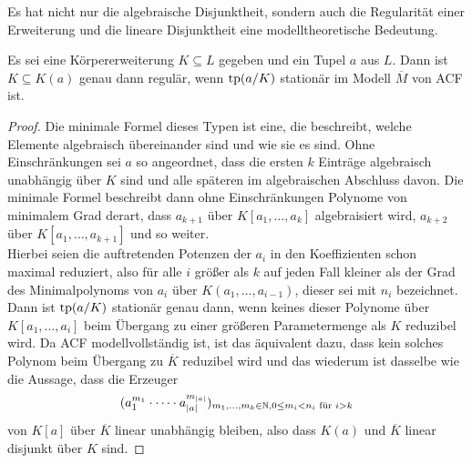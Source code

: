     Es hat nicht nur die algebraische Disjunktheit, sondern auch die Regularität einer Erweiterung und die lineare Disjunktheit eine modelltheoretische Bedeutung.
    
    \begin{lemma}
    	Es sei eine Körpererweiterung $K\subseteq L$ gegeben und ein Tupel $a$ aus $L$. Dann ist $K\subseteq K(a)$ genau dann regulär, wenn $\operatorname{tp}(a/K)$ stationär im Modell $\overline{M}$ von ACF ist.
    \end{lemma}
    \begin{proof}
    	Die minimale Formel dieses Typen ist eine, die beschreibt, welche Elemente algebraisch übereinander sind und wie sie es sind. Ohne Einschränkungen sei $a$ so angeordnet, dass die ersten $k$ Einträge algebraisch unabhängig über $K$ sind und alle späteren im algebraischen Abschluss davon. Die minimale Formel beschreibt dann ohne Einschränkungen Polynome von minimalem Grad derart, dass $a_{k+1}$ über $K[a_1,\dots,a_k]$ algebraisiert wird, $a_{k+2}$ über $K[a_1,\dots,a_{k+1}]$ und so weiter.\\
    	Hierbei seien die auftretenden Potenzen der $a_i$ in den Koeffizienten schon maximal reduziert, also für alle $i$ größer als $k$ auf jeden Fall kleiner als der Grad des Minimalpolynoms von $a_i$ über $K(a_1,\dots,a_{i-1})$, dieser sei mit $n_i$ bezeichnet. Dann ist $\operatorname{tp}(a/K)$ stationär genau dann, wenn keines dieser Polynome über $K[a_1,\dots,a_i]$ beim Übergang zu einer größeren Parametermenge als $K$ reduzibel wird. Da ACF modellvollständig ist, ist das äquivalent dazu, dass kein solches Polynom beim Übergang zu $\overline{K}$ reduzibel wird und das wiederum ist dasselbe wie die Aussage, dass die Erzeuger $$(a_1^{m_1}\cdot\dots\cdot a_{\left| a \right|}^{m_{\left| a \right|}})_{m_1,\dots,m_k\in\mathbb{N},0\leq m_i<n_i\text{ für }i>k}$$ von $K[a]$ über $\overline{K}$ linear unabhängig bleiben, also dass $K(a)$ und $\overline{K}$ linear disjunkt über $K$ sind.
    \end{proof}
    

